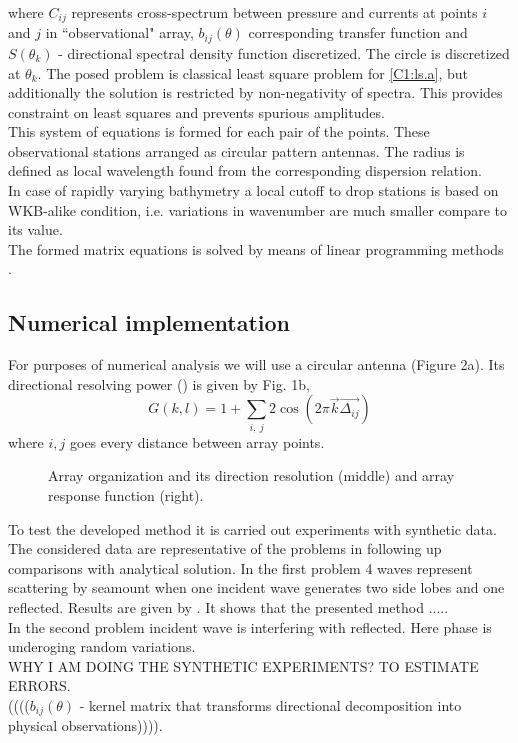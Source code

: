 where $C_{ij}$ represents cross-spectrum between pressure and currents at points $i$ and $j$ in ``observational" array, $b_{ij}(\theta)$ corresponding transfer function and $S(\theta_k)$ - directional spectral density function discretized. The circle is discretized at $\theta_k$. The posed problem is classical least square problem for \eqref{C1:ls.a}, but additionally the solution is restricted by non-negativity of spectra. This provides constraint on least squares and prevents spurious amplitudes.\\
This system of equations is formed for each pair of the points. These observational stations arranged as circular pattern antennas. The radius is defined as local wavelength found from the corresponding dispersion relation.\\
In case of rapidly varying bathymetry a local cutoff to drop stations is based on WKB-alike condition, i.e. variations in wavenumber are much smaller compare to its value.\\
The formed matrix equations is solved by means of linear programming methods \cite{haskell1981algorithm}.\\
\subsection{Numerical implementation}
For purposes of numerical analysis we will use a circular antenna (Figure 2a). Its directional resolving power (\cite{barber1963directional}) is given by Fig. 1b,
\begin{equation}
G(k,l) = 1 + \sum_{i,~j} 2\cos(2\pi \vec{k} \vec{\Delta_{ij}})
\end{equation}
where $i,j$ goes every distance between array points.\\
\begin{figure}
\caption{Array organization and its direction resolution (middle) and array response function (right).}
\end{figure}
To test the developed method it is carried out experiments with synthetic data. The considered data are representative of the problems in following up comparisons with analytical solution. In the first problem 4 waves represent scattering by seamount when one incident wave generates two side lobes and one reflected. Results are given by . It shows that the presented method .....\\
In the second problem incident wave is interfering with reflected. Here phase is underoging random variations.\\
WHY I AM DOING THE SYNTHETIC EXPERIMENTS? TO ESTIMATE ERRORS.\\
\small{(((($b_{ij}(\theta)$ - kernel matrix that transforms directional decomposition into physical observations)))).}\\

